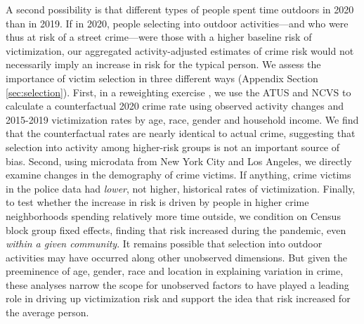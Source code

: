 \documentclass[12pt]{article}
\begin{document}
A second possibility is that different types of people spent time outdoors in 2020 than in 2019. If in 2020, people selecting into outdoor activities---and who were thus at risk of a street crime---were those with a higher baseline risk of victimization, our aggregated activity-adjusted estimates of crime risk would not necessarily imply an increase in risk for the typical person. We assess the importance of victim selection in three different ways (Appendix Section \ref{sec:selection}). First, in a reweighting exercise \citep{dinardo1996labor}, we use the ATUS and NCVS to calculate a counterfactual 2020 crime rate using observed activity changes and 2015-2019 victimization rates by age, race, gender and household income. We find that the counterfactual rates are nearly identical to actual crime, suggesting that selection into activity among higher-risk groups is not an important source of bias. Second, using microdata from New York City and Los Angeles, we directly examine changes in the demography of crime victims. If anything, crime victims in the police data had \textit{lower}, not higher, historical rates of victimization. Finally, to test whether the increase in risk is driven by people in higher crime neighborhoods spending relatively more time outside, we condition on Census block group fixed effects, finding that risk increased during the pandemic, even \emph{within a given community}. It remains possible that selection into outdoor activities may have occurred along other unobserved dimensions. But given the preeminence of age, gender, race and location in explaining variation in crime, these analyses narrow the scope for unobserved factors to have played a leading role in driving up victimization risk and support the idea that risk increased for the average person.

\end{document}
